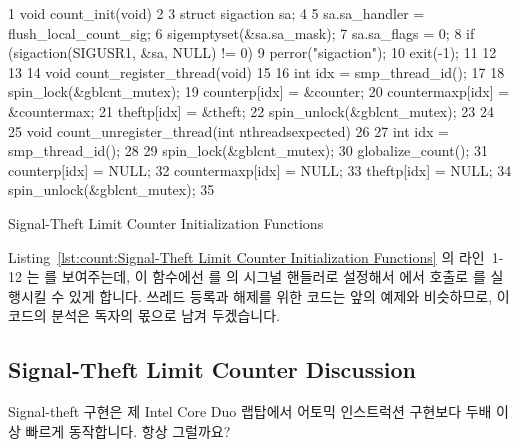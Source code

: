 \begin{listing}[tbp]
{ \scriptsize
\begin{verbbox}
  1 void count_init(void)
  2 {
  3   struct sigaction sa;
  4 
  5   sa.sa_handler = flush_local_count_sig;
  6   sigemptyset(&sa.sa_mask);
  7   sa.sa_flags = 0;
  8   if (sigaction(SIGUSR1, &sa, NULL) != 0) {
  9     perror("sigaction");
 10     exit(-1);
 11   }
 12 }
 13 
 14 void count_register_thread(void)
 15 {
 16   int idx = smp_thread_id();
 17 
 18   spin_lock(&gblcnt_mutex);
 19   counterp[idx] = &counter;
 20   countermaxp[idx] = &countermax;
 21   theftp[idx] = &theft;
 22   spin_unlock(&gblcnt_mutex);
 23 }
 24 
 25 void count_unregister_thread(int nthreadsexpected)
 26 {
 27   int idx = smp_thread_id();
 28 
 29   spin_lock(&gblcnt_mutex);
 30   globalize_count();
 31   counterp[idx] = NULL;
 32   countermaxp[idx] = NULL;
 33   theftp[idx] = NULL;
 34   spin_unlock(&gblcnt_mutex);
 35 }
\end{verbbox}
}
\centering
\theverbbox
\caption{Signal-Theft Limit Counter Initialization Functions}
\label{lst:count:Signal-Theft Limit Counter Initialization Functions}
\end{listing}

Listing~\ref{lst:count:Signal-Theft Limit Counter Initialization Functions}
의 라인~1-12 는  를 보여주는데, 이 함수에선
 를  의 시그널 핸들러로 설정해서
 에서  호출로
 를 실행시킬 수 있게 합니다.
쓰레드 등록과 해제를 위한 코드는 앞의 예제와 비슷하므로, 이 코드의 분석은
독자의 몫으로 남겨 두겠습니다.

\subsection{Signal-Theft Limit Counter Discussion}

Signal-theft 구현은 제 Intel Core Duo 랩탑에서 어토믹 인스트럭션 구현보다 두배
이상 빠르게 동작합니다.
항상 그럴까요?

